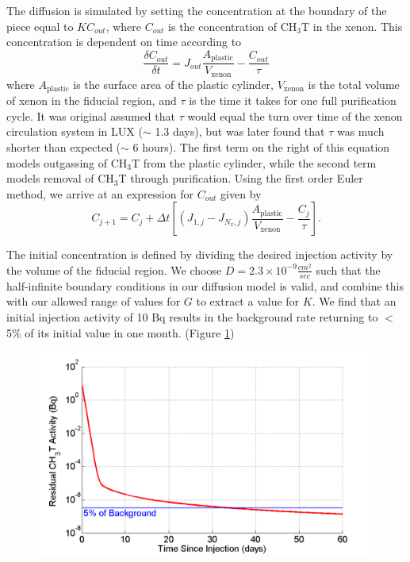 \documentclass[a4paper,12pt]{article}
\begin{document}
{The diffusion is simulated by setting the concentration at the boundary of the piece equal to $KC_{out}$, where $C_{out}$ is the concentration of CH$_3$T in the xenon. This concentration is dependent on time according to
\begin{equation}
\frac{\delta C_{out}}{\delta t} = J_{out} \frac{A_{\text{plastic}}}{V_{\text{xenon}}}-\frac{C_{out}}{\tau}
\end{equation}
where $A_{\text{plastic}}$ is the surface area of the
plastic cylinder, $V_{\text{xenon}}$ is the total volume of xenon in the fiducial region, and $\tau$ is the time it takes for one full purification cycle. It was original assumed that $\tau$ would equal the turn over time of the xenon circulation system in LUX ($\sim$ 1.3 days), but was later found that $\tau$ was much shorter than expected ($\sim$ 6 hours). The first term on the right of this equation models outgassing of CH$_3$T from the plastic cylinder, while the second term models removal of CH$_3$T through purification. Using the first order Euler method, we arrive at an expression for $C_{out}$ given by
\begin{equation}
C_{j+1}=C_j + \Delta t \left[\left( J_{1,j}-J_{N_x,j}\right) \frac{A_{\text{plastic}}}{V_{\text{xenon}}} - \frac{C_j}{\tau} \right].
\end{equation}

The initial concentration is defined by dividing the desired injection activity by the volume of the fiducial region. We choose $D = 2.3 \times 10^{-9} \frac{cm^2}{sec}$ such that the
half-infinite boundary conditions in our diffusion model is valid, and combine this with our allowed range of values for $G$ to extract a value for $K$. We find that an initial injection activity of 10 Bq results in the background rate returning to $<$ 5\% of its initial value in one month. \cite{JonOutgassing} (Figure \ref{OutgassingSim})

\begin{figure}
\includegraphics[scale=.3]{OutgassingSim.png} 
\label{OutgassingSim}
\end{figure}

}
\end{document}
